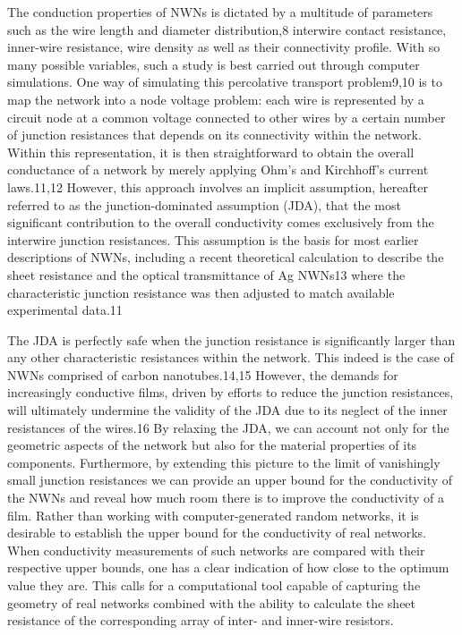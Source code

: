 The conduction properties of NWNs is dictated by a multitude of parameters such as the wire length and diameter distribution,8 interwire contact resistance, inner-wire resistance, wire density as well as their connectivity profile. With so many possible variables, such a study is best carried out through computer simulations. One way of simulating this percolative transport problem9,10 is to map the network into a node voltage problem: each wire is represented by a circuit node at a common voltage connected to other wires by a certain number of junction resistances that depends on its connectivity within the network. Within this representation, it is then straightforward to obtain the overall conductance of a network by merely applying Ohm's and Kirchhoff's current laws.11,12 However, this approach involves an implicit assumption, hereafter referred to as the junction-dominated assumption (JDA), that the most significant contribution to the overall conductivity comes exclusively from the interwire junction resistances. This assumption is the basis for most earlier descriptions of NWNs, including a recent theoretical calculation to describe the sheet resistance and the optical transmittance of Ag NWNs13 where the characteristic junction resistance was then adjusted to match available experimental data.11

The JDA is perfectly safe when the junction resistance is significantly larger than any other characteristic resistances within the network. This indeed is the case of NWNs comprised of carbon nanotubes.14,15 However, the demands for increasingly conductive films, driven by efforts to reduce the junction resistances, will ultimately undermine the validity of the JDA due to its neglect of the inner resistances of the wires.16 By relaxing the JDA, we can account not only for the geometric aspects of the network but also for the material properties of its components. Furthermore, by extending this picture to the limit of vanishingly small junction resistances we can provide an upper bound for the conductivity of the NWNs and reveal how much room there is to improve the conductivity of a film. Rather than working with computer-generated random networks, it is desirable to establish the upper bound for the conductivity of real networks. When conductivity measurements of such networks are compared with their respective upper bounds, one has a clear indication of how close to the optimum value they are. This calls for a computational tool capable of capturing the geometry of real networks combined with the ability to calculate the sheet resistance of the corresponding array of inter- and inner-wire resistors.

